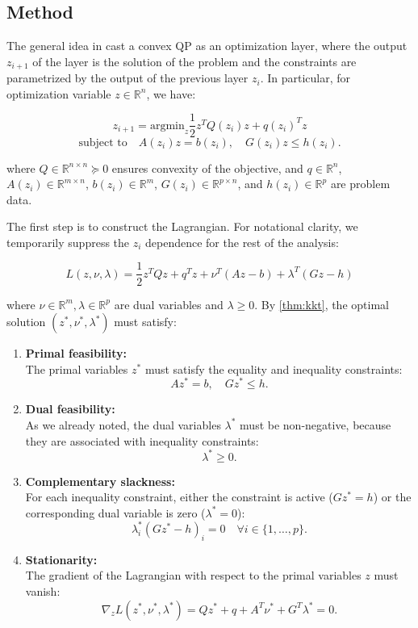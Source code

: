 \documentclass{article}
\begin{document}
\subsection{Method}

The general idea in \citet{optnet} cast a convex QP as an optimization layer, where the output  $z_{i+1}$ of the layer is the solution of the problem and the constraints are parametrized by the output of the previous layer $z_i$. In particular, for optimization variable $z \in \mathbb{R}^n$, we have: 

\[
z_{i+1} = \text{argmin}_{z} \frac{1}{2} z^T Q(z_i) z + q(z_i)^T z
\]
\[
\text{subject to} \quad A(z_i) z = b(z_i), \quad G(z_i) z \leq h(z_i).
\]

where \( Q \in \mathbb{R}^{n \times n} \succeq 0 \) ensures convexity of the objective, and \( q \in \mathbb{R}^n \), 
\( A(z_i) \in \mathbb{R}^{m \times n} \), \( b(z_i) \in \mathbb{R}^m \), \( G(z_i) \in \mathbb{R}^{p \times n} \), and \( h(z_i) \in \mathbb{R}^p \) are problem data. 

The first step is to construct the Lagrangian. For notational clarity, we temporarily suppress the $z_i$ dependence for the rest of the analysis:

\[
L(z,\nu,\lambda) = \frac{1}{2}z^T Q z + q^T z + \nu^T(Az - b) + \lambda^T(Gz - h)
\]

where $\nu \in \mathbb{R}^m, \lambda \in \mathbb{R}^p$ are dual variables and $\lambda \geq 0$. By \ref{thm:kkt}, the optimal solution $(z^*, \nu^*, \lambda^*)$ must satisfy: 

\begin{enumerate}
    \item \textbf{Primal feasibility:} \\
    The primal variables $z^*$ must satisfy the equality and inequality constraints:
    \[
    Az^* = b, \quad Gz^* \leq h.
    \]

    \item \textbf{Dual feasibility:} \\
    As we already noted, the dual variables $\lambda^*$ must be non-negative, because they are associated with inequality constraints:
    \[
    \lambda^* \geq 0.
    \]

    \item \textbf{Complementary slackness:} \\
    For each inequality constraint, either the constraint is active ($Gz^* = h$) or the corresponding dual variable is zero ($\lambda^* = 0$):
    \[
    \lambda_i^* (Gz^* - h)_i = 0 \quad \forall i \in \{1, \ldots, p\}.
    \]

    \item \textbf{Stationarity:} \\
    The gradient of the Lagrangian with respect to the primal variables $z$ must vanish:
    \[
    \nabla_z L(z^*, \nu^*, \lambda^*) = Qz^* + q + A^T\nu^* + G^T\lambda^* = 0.
    \]
\end{enumerate}
\end{document}
